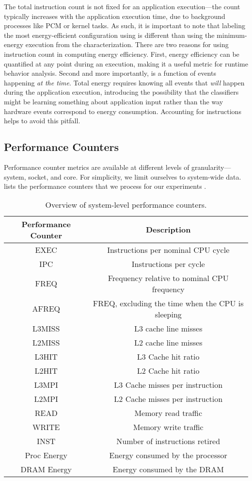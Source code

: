 The total instruction count is not fixed for an application execution---the count typically increases with the application execution time, \eg due to background processes like PCM or kernel tasks.
As such, it is important to note that labeling the most energy-efficient configuration using  is different than using the minimum-energy execution from the characterization.
There are two reasons for using instruction count in computing energy efficiency.
First, energy efficiency can be quantified at any point during an execution, making it a useful metric for runtime behavior analysis.
Second and more importantly,  is a function of events happening \emph{at the time}.
Total energy requires knowing all events that \emph{will} happen during the application execution, introducing the possibility that the classifiers might be learning something about application input rather than the way hardware events correspond to energy consumption.
Accounting for instructions helps to avoid this pitfall.


\subsection{Performance Counters}
\label{sec:perf-counters}

Performance counter metrics are available at different levels of granularity---system, socket, and core.
For simplicity, we limit ourselves to system-wide data.
 lists the performance counters that we process for our experiments \cite{PCMFields}.

\begin{table}[t]
\caption{Overview of system-level performance counters.}
\label{tbl:pcm}
\small
\centering
\begin{tabular}{cc}
  \textbf{Performance Counter} & \textbf{Description} \\
  \hline
  \hline
  EXEC & Instructions per nominal CPU cycle \\
  IPC & Instructions per cycle \\
  FREQ & Frequency relative to nominal CPU frequency \\
  AFREQ & FREQ, excluding the time when the CPU is sleeping \\
  L3MISS & L3 cache line misses \\
  L2MISS & L2 cache line misses \\
  L3HIT & L3 Cache hit ratio \\
  L2HIT & L2 Cache hit ratio \\
  L3MPI & L3 Cache misses per instruction \\
  L2MPI & L2 Cache misses per instruction \\
  READ & Memory read traffic \\
  WRITE & Memory write traffic \\
  INST & Number of instructions retired \\
  Proc Energy & Energy consumed by the processor \\
  DRAM Energy & Energy consumed by the DRAM \\
  \hline
  \hline
\end{tabular}
\end{table}

